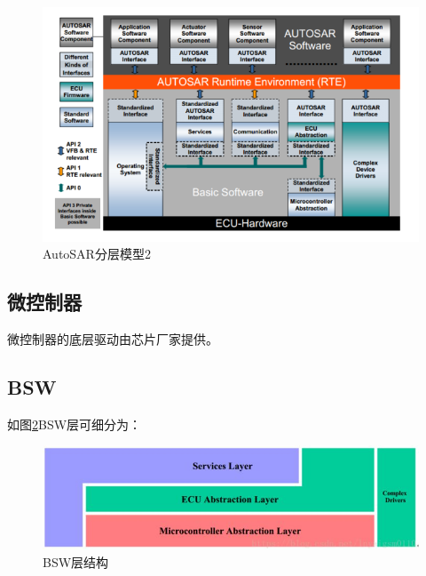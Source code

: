 \begin{figure}[ht]
	\centering
	\includegraphics[scale=0.7]{./pic/autosar_struct_2.png}
	\caption{AutoSAR分层模型2}
	\label{fig:AutoSAR_struct2}
\end{figure}

\subsection{微控制器}
微控制器的底层驱动由芯片厂家提供。

\subsection{BSW}
如图\ref{fig:bsw_struct_1}BSW层可细分为：
\begin{figure}[ht]
	\centering
	\includegraphics[scale=0.5]{pic/autosar_bsw_1.jpg}
	\caption{BSW层结构}
	\label{fig:bsw_struct_1}
\end{figure}

